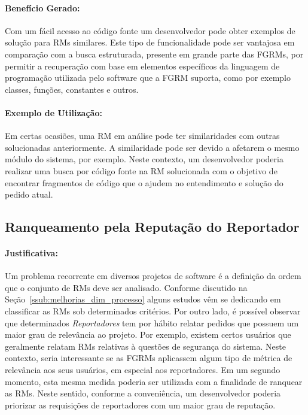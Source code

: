\paragraph{Benefício Gerado:}
\label{par:beneficios_s02}

Com um fácil acesso ao código fonte um desenvolvedor pode obter exemplos de
solução para RMs similares. Este tipo de funcionalidade pode ser vantajosa em
comparação com a busca estruturada, presente em grande parte das FGRMs, por
permitir a recuperação com base em elementos específicos da linguagem de
programação utilizada pelo software que a FGRM suporta, como por exemplo
classes, funções, constantes e outros.

\paragraph{Exemplo de Utilização:}
\label{par:exemplo_s02}

Em certas ocasiões, uma RM em análise pode ter similaridades com outras
solucionadas anteriormente. A similaridade pode ser devido a afetarem o mesmo
módulo do sistema, por exemplo. Neste contexto, um desenvolvedor poderia
realizar uma busca por código fonte na RM solucionada com o objetivo de
encontrar fragmentos de código que o ajudem no entendimento e solução do pedido
atual.

\subsection{Ranqueamento pela Reputação do Reportador}
\label{sub:diferenciacao_do_reportdor}


\paragraph{Justificativa:}
\label{par:justificativa_s03}

Um problema recorrente em diversos projetos de software é a definição da ordem
que o conjunto de RMs deve ser analisado. Conforme discutido na
Seção~\ref{ssub:melhorias_dim_processo} alguns estudos vêm se dedicando em
classificar as RMs sob determinados critérios. Por outro lado, é possível
observar que determinados \textit{Reportadores} tem por hábito relatar pedidos
que possuem um maior grau de relevância ao projeto. Por exemplo, existem certos
usuários que geralmente relatam RMs relativas à questões de segurança do
sistema. Neste contexto, seria interessante se as FGRMs aplicassem algum tipo de
métrica de relevância aos seus usuários, em especial aos reportadores. Em um
segundo momento, esta mesma medida poderia ser utilizada com a finalidade de
ranquear as RMs. Neste sentido, conforme a conveniência, um desenvolvedor
poderia priorizar as requisições de reportadores com um maior grau de reputação.

